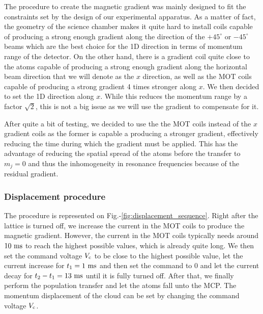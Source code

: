 The procedure to create the magnetic gradient was mainly designed to fit the constraints set by the design of our experimental apparatus. As a matter of fact, the geometry of the science chamber makes it quite hard to install coils capable of producing a strong enough gradient along the direction of the $+45^{\circ}$ or $-45^{\circ}$ beams which are the best choice for the 1D direction in terms of momentum range of the detector. On the other hand, there is a gradient coil quite close to the atoms capable of producing a strong enough gradient along the horizontal beam direction that we will denote as the $x$ direction, as well as the MOT coils capable of producing a strong gradient 4 times stronger along $x$. We then decided to set the 1D direction along $x$. While this reduces the momentum range by a factor $\sqrt{2}$, this is not a big issue as we will use the gradient to compensate for it. 

After quite a bit of testing, we decided to use the the MOT coils instead of the $x$ gradient coils as the former is capable a producing a stronger gradient, effectively reducing the time during which the gradient must be applied. This has the advantage of reducing the spatial spread of the atoms before the transfer to $m_j=0$ and thus the inhomogeneity in resonance frequencies because of the residual gradient.  

\subsubsection{Displacement procedure}

The procedure is represented on Fig.-\ref{fig:displacement_sequence}. Right after the lattice is turned off, we increase the current in the MOT coils to produce the magnetic gradient. However, the current in the MOT coils typically needs around $10 \ \rm{ms}$ to reach the highest possible values, which is already quite long. We then set the command voltage $V_{\rm{c}}$ to be close to the highest possible value, let the current increase for $t_1 = 1 \ \rm{ms}$ and then set the command to $0$ and let the current decay for $t_2-t_1=13 \ \rm{ms}$ until it is fully turned off. After that, we finally perform the population transfer and let the atoms fall unto the MCP. The momentum displacement of the cloud can be set by changing the command voltage $V_{\rm{c}}$.

